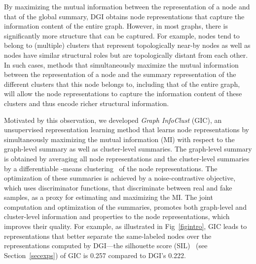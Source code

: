 \documentclass{article}
\begin{document}
By maximizing the mutual information between the representation of a node and that of the global summary, DGI 
obtains node representations that capture the information content of the entire graph. However, in most graphs, there is significantly more structure that can be captured. For example, nodes tend to belong to (multiple) clusters that represent topologically near-by nodes as well as nodes have similar structural roles but are topologically distant from each other. In such cases, methods that simultaneously maximize the mutual information between the representation of a node and the summary representation of the different clusters that this node belongs to, including that of the entire graph, will allow the node representations to capture the information content of these clusters and thus encode richer structural information.



Motivated by this observation, we developed \emph{Graph InfoClust} (GIC), an unsupervised representation learning method that learns node representations by simultaneously maximizing the mutual information (MI) with respect to the graph-level summary as well as cluster-level summaries. The graph-level summary is obtained by averaging all node representations and the cluster-level summaries by a differentiable -means clustering~\cite{wilder2019end} of the node representations.  The optimization of these summaries is achieved by a noise-contrastive objective, which uses discriminator functions, that discriminate between real and fake samples, as a proxy for estimating and maximizing the MI. The joint computation and optimization of the summaries, promotes both graph-level and cluster-level information and properties to the node representations, which improves their quality. 
For example, as illustrated in Fig~\ref{figintro}, GIC leads to representations that better separate the same-labeled nodes over the representations computed by DGI---the silhouette score (SIL)~\cite{rousseeuw1987silhouettes} (see Section~\ref{secexps}) of GIC is 0.257 compared to DGI's 0.222.
\end{document}

